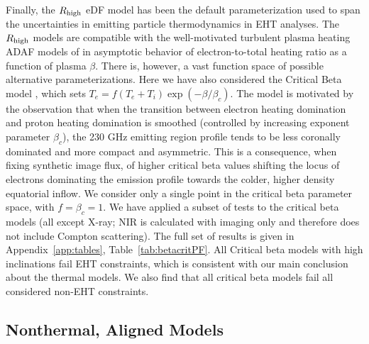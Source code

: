 Finally, the $R_\mathrm{high}$ eDF model has been the default parameterization used to span the uncertainties in emitting particle thermodynamics in EHT analyses. The $R_\mathrm{high}$ models  are compatible with the well-motivated turbulent plasma heating ADAF models of \cite{1999ApJ...520..248Q} in asymptotic behavior of electron-to-total heating ratio as a function of plasma $\beta$. There is, however, a vast function space of possible alternative parameterizations. Here we have also considered the Critical Beta model \cite{2020MNRAS.493.1404A}, which sets $T_e = f (T_e + T_i) \exp(-\beta/\beta_c)$.  The model is motivated by the observation that when the transition between electron heating domination and proton heating domination is smoothed (controlled by increasing exponent parameter $\beta_c$), the 230 GHz emitting region profile tends to be less coronally dominated and more compact and asymmetric. This is a consequence, when fixing synthetic image flux, of higher critical beta values shifting the locus of electrons dominating the emission profile towards the colder, higher density equatorial inflow.  We consider only a single point in the critical beta parameter space, with $f = \beta_c = 1$. We have applied a subset of tests to the critical beta models (all except X-ray; NIR is calculated with imaging only and therefore does not include Compton scattering).  The full set of results is given in Appendix~\ref{app:tables}, Table~\ref{tab:betacritPF}. All Critical beta models with high inclinations fail EHT constraints, which is consistent with our main conclusion about the thermal models. We also find that all critical beta models fail all considered non-EHT constraints.


\subsection{Nonthermal, Aligned Models}


